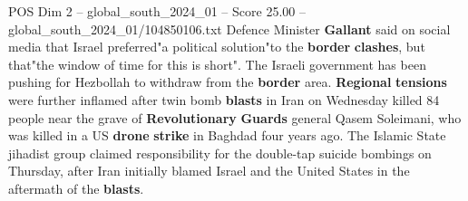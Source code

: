 \begin{textsample}{POS Dim 2 – global\_south\_2024\_01 – Score 25.00 – global\_south\_2024\_01/104850106.txt}
Defence Minister \textbf{Gallant} said on social media that Israel preferred"a political solution"to the \textbf{border} \textbf{clashes}, but that"the window of time for this is short".
The Israeli government has been pushing for Hezbollah to withdraw from the \textbf{border} area. \textbf{Regional} \textbf{tensions} were further inflamed after twin bomb \textbf{blasts} in Iran on Wednesday killed 84 people near the grave of \textbf{Revolutionary} \textbf{Guards} general Qasem Soleimani, who was killed in a US \textbf{drone} \textbf{strike} in Baghdad four years ago.
The Islamic State jihadist group claimed responsibility for the double-tap suicide bombings on Thursday, after Iran initially blamed Israel and the United States in the aftermath of the \textbf{blasts}.

\end{textsample}
